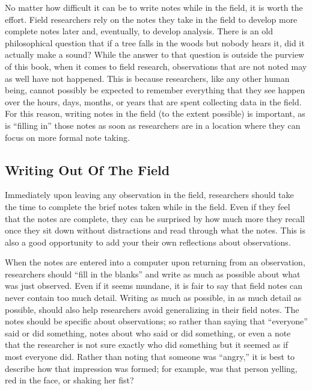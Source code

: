 No matter how difficult it can be to write notes while in the field, it is worth the effort. Field researchers rely on the notes they take in the field to develop more complete notes later and, eventually, to develop analysis. There is an old philosophical question that if a tree falls in the woods but nobody hears it, did it actually make a sound? While the answer to that question is outside the purview of this book, when it comes to field research, observations that are not noted may as well have not happened. This is because researchers, like any other human being, cannot possibly be expected to remember everything that they see happen over the hours, days, months, or years that are spent collecting data in the field. For this reason, writing notes in the field (to the extent possible) is important, as is ``filling in'' those notes as soon as researchers are in a location where they can focus on more formal note taking.

\subsection{Writing Out Of The Field}

Immediately upon leaving any observation in the field, researchers should take the time to complete the brief notes taken while in the field. Even if they feel that the notes are complete, they can be surprised by how much more they recall once they sit down without distractions and read through what the notes. This is also a good opportunity to add your their own reflections about observations.

When the notes are entered into a computer upon returning from an observation, researchers should ``fill in the blanks'' and write as much as possible about what was just observed. Even if it seems mundane, it is fair to say that field notes can never contain too much detail. Writing as much as possible, in as much detail as possible, should also help researchers avoid generalizing in their field notes. The notes should be specific about observations; so rather than saying that ``everyone'' said or did something, notes about who said or did something, or even a note that the researcher is not sure exactly who did something but it seemed as if most everyone did. Rather than noting that someone was ``angry,'' it is best to describe how that impression was formed; for example, was that person yelling, red in the face, or shaking her fist?

